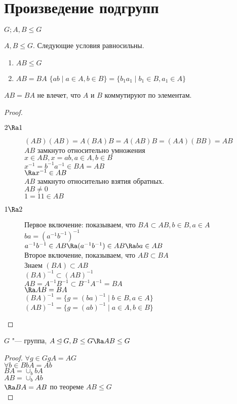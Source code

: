 ﻿\section{Произведение подгрупп}
$G; A, B \le G$\\
\begin{theorem}
$A, B \le G$. Следующие условия равносильны.\\
    \begin{enumerate}
    \item $AB \le G$\\
    \item $AB = BA$
    $\{ab \mid a \in  A, b \in B\} = \{b_1a_1 \mid b_1 \in B, a_1 \in A\}$\\
    \end{enumerate}
\end{theorem}
\begin{Rem}
$AB = BA$ не влечет, что $A$ и $B$ коммутируют по элементам.
\end{Rem}
\begin{proof}
\begin{description}
\item[$2 \Ra 1$]
$(AB)(AB) = A(BA)B = A(AB)B = (AA)(BB) = AB$\\
$AB$ замкнуто относительно умножения\\
$x \in AB, x = ab, a\in A, b \in B$\\
$x^{-1} = b^{-1}a^{-1} \in BA = AB$\\
$\Ra x^{-1} \in AB$\\

$AB$ замкнуто относительно взятия обратных.\\
$AB \ne 0$\\
$1 = 11 \in AB$

\item[$1 \Ra 2$]
Первое включение: показываем, что
$BA \subset AB, b \in B, a \in A$\\
$ba = (a^{-1}b^{-1})^{-1}$\\
$a^{-1}b^{-1} \in AB \Ra (a^{-1}b^{-1}) \in AB \Ra ba \in AB$\\

Второе включение, показываем, что
$AB \subset BA$\\
Знаем $(BA) \subset AB$\\
$(BA)^{-1} \subset (AB)^{-1}$\\
$AB = A^{-1}B^{-1} \subset B^{-1}A^{-1} = BA$\\
$\Ra AB = BA$\\

$(BA)^{-1} = \{g = (ba)^{-1}\mid b \in B, a \in A\}$\\
$(AB)^{-1} = \{g = (ab)^{-1}\mid a \in A, b \in B\}$\\
\end{description}
\end{proof}
\begin{conseq}
$G$ "--- группа, $A \unlhd G, B \le G \Ra AB \le G$ \\
\end{conseq}
\begin{proof}
$\forall g \in G gA = AG$\\
$\forall b \in B bA = Ab$\\

$BA = \cup_b bA$\\
$AB = \cup_b Ab$\\
$\Ra BA = AB$ по теореме $AB \le G$\\
\end{proof}